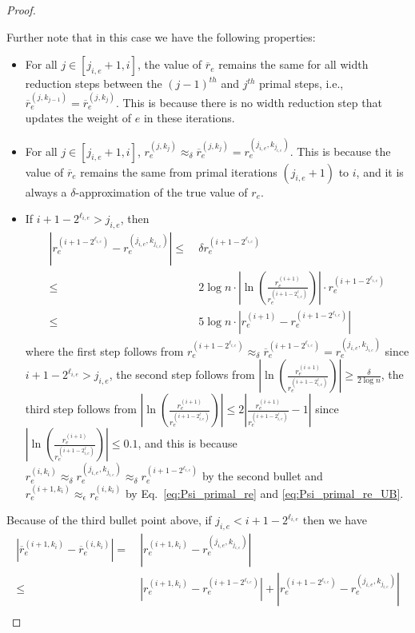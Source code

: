 \documentclass[11pt]{article}
\newcommand\rr{\boldsymbol{\mathit{r}}}
\newcommand\rrbar{\overline{\boldsymbol{\mathit{r}}}}
\newcommand{\ov}{\overline}
\begin{document}
\begin{proof}
\begin{enumerate}
Further note that in this case we have the following properties:
\begin{itemize}
\item For all $j \in [j_{i,e}+1, i]$, the value of $\rrbar_e$ remains the same for all width reduction steps between the $(j-1)^{th}$ and $j^{th}$ primal steps, i.e., $\rrbar^{(j,k_{j-1})}_e = \rrbar^{(j,k_{j})}_e$. This is because there is no width reduction step that updates the weight of $e$ in these iterations.
\item For all $j \in [j_{i,e}+1, i]$, $\rr_e^{(j,k_j)} \approx_{\delta} \ov{\rr}_e^{(j,k_j)} = \rr_e^{(j_{i,e},k_{j_{i,e}})}$. This is because the value of $\ov{\rr}_e$ remains the same from primal iterations $(j_{i,e}+1)$ to $i$, and it is always a $\delta$-approximation of the true value of $\rr_e$.
\item If $i+1-2^{\ell_{i,e}} > j_{i,e}$, then
\begin{align*}
|\rr_e^{(i+1-2^{\ell_{i,e}})} - \rr_e^{(j_{i,e},k_{j_{i,e}})}| \leq &~ \delta \rr_e^{(i+1-2^{\ell_{i,e}})} \\
\leq &~ 2 \log n \cdot |\ln(\frac{\rr_e^{(i+1)}}{\rr_e^{(i+1-2^\ell_{i,e})}})| \cdot \rr_e^{(i+1-2^{\ell_{i,e}})} \\
\leq &~ 5 \log n \cdot |\rr_e^{(i+1)} - \rr_e^{(i+1-2^{\ell_{i,e}})}|
\end{align*}
where the first step follows from $\rr_e^{(i+1-2^{\ell_{i,e}})} \approx_{\delta} \ov{\rr}_e^{(i+1-2^{\ell_{i,e}})} = \rr_e^{(j_{i,e},k_{j_{i,e}})}$ since $i+1-2^{\ell_{i,e}} > j_{i,e}$, the second step follows from $|\ln(\frac{\rr_e^{(i+1)}}{\rr_e^{(i+1-2^\ell_{i,e})}})| \geq \frac{\delta}{2 \log n}$, the third step follows from $|\ln(\frac{\rr_e^{(i+1)}}{\rr_e^{(i+1-2^\ell_{i,e})}})| \leq 2 |\frac{\rr_e^{(i+1)}}{\rr_e^{(i+1-2^\ell_{i,e})}} - 1|$ since $|\ln(\frac{\rr_e^{(i+1)}}{\rr_e^{(i+1-2^\ell_{i,e})}})| \leq 0.1$, and this is because $\rr_e^{(i,k_i)} \approx_{\delta} \rr_e^{(j_{i,e}, k_{j_{i,e}})} \approx_{\delta} \rr_e^{(i+1-2^{\ell_{i,e}})} $ by the second bullet and $\rr_e^{(i+1,k_i)} \approx_{\epsilon} \rr_e^{(i,k_i)}$ by Eq.~\eqref{eq:Psi_primal_re} and \eqref{eq:Psi_primal_re_UB}.
\end{itemize}
\end{enumerate}
Because of the third bullet point above, if $j_{i,e} < i+1-2^{\ell_{i,e}}$ then we have
\begin{align*}
|\ov{\rr}^{(i+1,k_i)}_e - \ov{\rr}^{(i ,k_i)}_e| = &~ |\rr_e^{(i+1,k_i)} - \rr_e^{(j_{i,e},k_{j_{i,e}})}| \\
\leq &~ |\rr^{(i+1,k_i)}_e - \rr^{(i+1-2^{\ell_{i,e}})}_e| + |\rr^{(i+1-2^{\ell_{i,e}})}_e - \rr^{(j_{i,e},k_{j_{i,e}})}_e| \\

\end{align*}
\end{proof}
\end{document}
